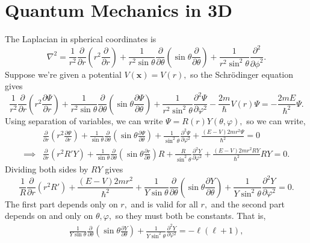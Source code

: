 \documentclass{article}
\numberwithin{equation}{section}
\begin{document}
\section{Quantum Mechanics in 3D}
The Laplacian in spherical coordinates is 
\begin{equation}
    \nabla^2 = \frac{1}{r^2}\frac{\partial}{\partial r}\left(r^2 \frac{\partial}{\partial r}\right) + \frac{1}{r^2\sin\theta}\frac{\partial}{\partial\theta}\left(\sin\theta\frac{\partial}{\partial\theta}\right) + \frac{1}{r^2\sin^2\theta}\frac{\partial^2}{\partial\phi^2}.
\end{equation}
Suppose we're given a potential $V(\bm{x})=V(r),$ so the Schrödinger equation gives 
\begin{equation}
    \frac{1}{r^2}\frac{\partial}{\partial r}\left(r^2\frac{\partial\Psi}{\partial r}\right) + \frac{1}{r^2\sin\theta} \frac{\partial}{\partial \theta}\left(\sin\theta \frac{\partial \Psi}{\partial \theta}\right) + \frac{1}{r^2\sin^2\theta} \frac{\partial^2\Psi}{\partial \varphi^2} - \frac{2m}{\hbar}V(r)\Psi = -\frac{2mE}{\hbar^2}\Psi.
\end{equation}
Using separation of variables, we can write $\Psi = R(r)Y(\theta,\varphi),$ so we can write,
\begin{align*}
    &\frac{\partial}{\partial r}\left(r^2 \frac{\partial \Psi}{\partial r}\right) + \frac{1}{\sin\theta}\frac{\partial}{\partial\theta}\left(\sin\theta \frac{\partial\Psi}{\partial \theta}\right) + \frac{1}{\sin^2\theta}\frac{\partial^2\Psi}{\partial\varphi^2} + \frac{(E-V)2mr^2\Psi}{\hbar^2}=0 \\ 
\implies & \frac{\partial}{\partial r}(r^2R'Y) + \frac{1}{\sin\theta}\frac{\partial}{\partial\theta}\left(\sin\theta \frac{\partial r}{\partial\theta}\right)R + \frac{R}{\sin^2\theta}\frac{\partial^2Y}{\partial\varphi^2}+\frac{(E-V)2mr^2RY}{\hbar^2} RY = 0.
\end{align*}
Dividing both sides by $RY$ gives 
\begin{equation*}
    \frac{1}{R}\frac{\partial}{\partial r}(r^2R') + \frac{(E-V)2mr^2}{\hbar^2} + \frac{1}{Y\sin\theta}\frac{\partial}{\partial\theta}\left(\sin\theta\frac{\partial Y}{\partial\theta}\right) + \frac{1}{Y\sin^2\theta}\frac{\partial^2Y}{\partial\varphi^2}=0.
\end{equation*}
The first part depends only on $r,$ and is valid for all $r,$ and the second part depends on and only on $\theta,\varphi,$ so they must both be constants. That is,
\begin{align*}
    \frac{1}{Y\sin\theta}\frac{\partial}{\partial\theta}\left(\sin\theta \frac{\partial Y}{\partial \theta}\right) + \frac{1}{Y\sin^2\theta}\frac{\partial^2 Y}{\partial\varphi^2} = -\ell(\ell + 1), 
\end{align*}
\end{document}
